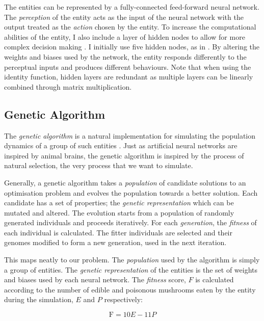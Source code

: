 \documentclass[12pt,a4paper]{report}
\begin{document}
The entities can be represented by a fully-connected feed-forward neural network. The  \emph{perception} of the entity acts as the input of the neural network with the output treated as the \emph{action} chosen by the entity. To increase the computational abilities of the entity, I also include a layer of hidden nodes to allow for more complex decision making \citep{de1993backpropagation}. I initially use five hidden nodes, as in \citet{Cangelosi1998}. By altering the weights and biases used by the network, the entity responds differently to the perceptual inputs and produces different behaviours. Note that when using the identity function, hidden layers are redundant as multiple layers can be linearly combined through matrix multiplication.

\subsection{Genetic Algorithm}\label{section:genetic}

The \emph{genetic algorithm} is a natural implementation for simulating the population dynamics of a group of such entities \citep{holland1992adaptation}. Just as artificial neural networks are inspired by animal brains, the genetic algorithm is inspired by the process of natural selection, the very process that we want to simulate. 

Generally, a genetic algorithm takes a \emph{population} of candidate solutions to an optimisation problem and evolves the population towards a better solution. Each candidate has a set of properties; the \emph{genetic representation} which can be mutated and altered. The evolution starts from a population of randomly generated individuals and proceeds iteratively. For each \emph{generation}, the \emph{fitness} of each individual is calculated. The fitter individuals are selected and their genomes modified to form a new generation, used in the next iteration.

This maps neatly to our problem. The \emph{population} used by the algorithm is simply a group of entities. The \emph{genetic representation} of the entities is the set of weights and biases used by each neural network. The \emph{fitness} score, $F$ is calculated according to the number of edible and poisonous mushrooms eaten by the entity during the simulation, $E$ and $P$ respectively:

\begin{equation}
\label{equation:fitness}
\mathrm{F} = 10 E - 11 P
\end{equation}
\end{document}
